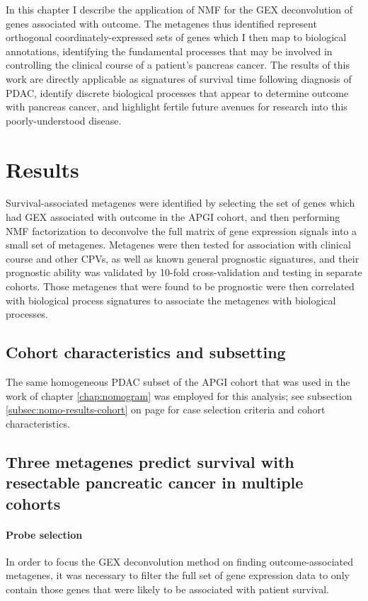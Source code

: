 \documentclass[dissertation.tex]{subfiles}
\begin{document}
In this chapter I describe the application of \gls{NMF} for the \gls{GEX} deconvolution of genes associated with outcome.  The metagenes thus identified represent orthogonal coordinately-expressed sets of genes which I then map to biological annotations, identifying the fundamental processes that may be involved in controlling the clinical course of a patient's pancreas cancer.  The results of this work are directly applicable as signatures of survival time following diagnosis of \gls{PDAC}, identify discrete biological processes that appear to determine outcome with pancreas cancer, and highlight fertile future avenues for research into this poorly-understood disease.


\section{Results}

Survival-associated metagenes were identified by selecting the set of genes which had \gls{GEX} associated with outcome in the \gls{APGI} cohort, and then performing \gls{NMF} factorization to deconvolve the full matrix of gene expression signals into a small set of metagenes.  Metagenes were then tested for association with clinical course and other \glspl{CPV}, as well as known general prognostic signatures, and their prognostic ability was validated by 10-fold cross-validation and testing in separate cohorts.  Those metagenes that were found to be prognostic were then correlated with biological process signatures to associate the metagenes with biological processes.

\subsection{Cohort characteristics and subsetting}
The same homogeneous \gls{PDAC} subset of the \gls{APGI} cohort that was used in the work of chapter \ref{chap:nomogram} was employed for this analysis; see subsection \ref{subsec:nomo-results-cohort} on page \pageref{subsec:nomo-results-cohort} for case selection criteria and cohort characteristics.

\subsection{Three metagenes predict survival with resectable pancreatic cancer in multiple cohorts}
\paragraph{Probe selection}
In order to focus the \gls{GEX} deconvolution method on finding outcome-associated metagenes, it was necessary to filter the full set of gene expression data to only contain those genes that were likely to be associated with patient survival.  %
\end{document}
